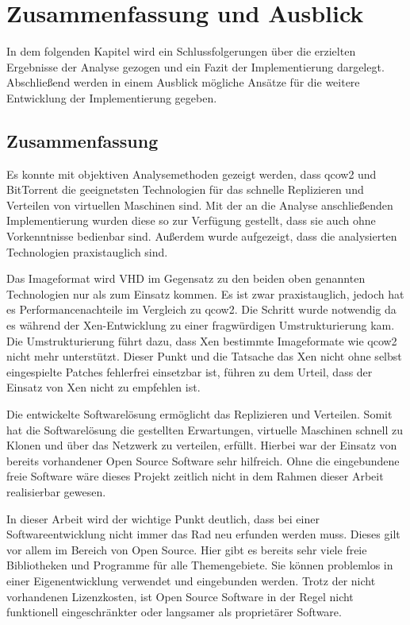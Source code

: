\chapter{Zusammenfassung und Ausblick} 
In dem folgenden Kapitel wird ein Schlussfolgerungen über die erzielten Ergebnisse der Analyse gezogen und ein Fazit der Implementierung dargelegt. Abschließend werden in einem Ausblick mögliche Ansätze für die weitere Entwicklung der Implementierung gegeben.

\section{Zusammenfassung}
Es konnte mit objektiven Analysemethoden gezeigt werden, dass qcow2 und BitTorrent die geeignetsten Technologien für das schnelle Replizieren und Verteilen von virtuellen Maschinen sind. Mit der an die Analyse anschließenden Implementierung wurden diese so zur Verfügung gestellt, dass sie auch ohne Vorkenntnisse bedienbar sind. Außerdem wurde aufgezeigt, dass die analysierten Technologien praxistauglich sind.

Das Imageformat wird VHD im Gegensatz zu den beiden oben genannten Technologien nur als zum Einsatz kommen. Es ist zwar praxistauglich, jedoch hat es Performancenachteile im Vergleich zu qcow2. Die Schritt wurde notwendig da es während der Xen-Entwicklung zu einer fragwürdigen Umstrukturierung kam. Die Umstrukturierung führt dazu, dass Xen bestimmte Imageformate wie qcow2 nicht mehr unterstützt. Dieser Punkt und die Tatsache das Xen nicht ohne selbst eingespielte Patches fehlerfrei einsetzbar ist, führen zu dem Urteil, dass der Einsatz von Xen nicht zu empfehlen ist.

Die entwickelte Softwarelösung ermöglicht das Replizieren und Verteilen. Somit hat die Softwarelösung die gestellten Erwartungen, virtuelle Maschinen schnell zu Klonen und über das Netzwerk zu verteilen, erfüllt. Hierbei war der Einsatz von bereits vorhandener Open Source Software sehr hilfreich. Ohne die eingebundene freie Software wäre dieses Projekt zeitlich nicht in dem Rahmen dieser Arbeit realisierbar gewesen.

In dieser Arbeit wird der wichtige Punkt deutlich, dass bei einer Softwareentwicklung nicht immer das Rad neu erfunden werden muss. Dieses gilt vor allem im Bereich von Open Source. Hier gibt es bereits sehr viele freie Bibliotheken und Programme für alle Themengebiete. Sie können problemlos in einer Eigenentwicklung verwendet und eingebunden werden. Trotz der nicht vorhandenen Lizenzkosten, ist Open Source Software in der Regel nicht funktionell eingeschränkter oder langsamer als proprietärer Software.


